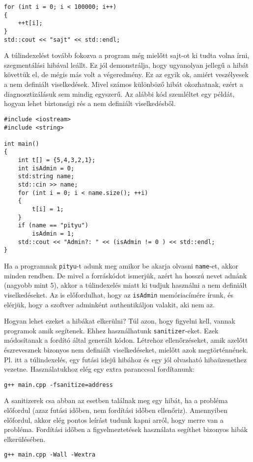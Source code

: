 \documentclass[a4paper,11.5pt,table]{article}
\begin{document}
	\begin{lstlisting}
for (int i = 0; i < 100000; i++)
{
	++t[i];
}
std::cout << "sajt" << std::endl;
	\end{lstlisting} 
	A túlindexelést tovább fokozva a program még mielőtt sajt-ot ki tudta volna írni, szegmentálási hibával leállt. Ez jól demonstrálja, hogy ugyanolyan jellegű  a hibát követtük el, de mégis más volt a végeredmény. Ez az egyik ok, amiért veszélyesek a nem definiált viselkedések. Mivel számos különböző hibát okozhatnak, ezért a diagnosztizálásuk sem mindig egyszerű. Az alábbi kód szemléltet egy példát, hogyan lehet biztonsági rés a nem definiált viselkedésből.
	\begin{lstlisting}
#include <iostream>
#include <string>

int main()
{
	int t[] = {5,4,3,2,1};
	int isAdmin = 0;
	std:string name;
	std::cin >> name;
	for (int i = 0; i < name.size(); ++i)
	{
		t[i] = 1;
	}
	if (name == "pityu")
		isAdmin = 1;
	std::cout << "Admin?: " << (isAdmin != 0 ) << std::endl;
}
	\end{lstlisting}
	Ha a programnak \texttt{pityu}-t adunk meg amikor be akarja olvasni \texttt{name}-et, akkor minden rendben. De mivel a forráskódot ismerjük, azért ha hosszú nevet adnánk (nagyobb mint 5), akkor a túlindexelés miatt ki tudjuk használni a nem definiált viselkedéseket. Az is előfordulhat, hogy az \texttt{isAdmin} memóriacímére írunk, és elérjük, hogy a szoftver adminként authentikáljon valakit, aki nem az.
	\medskip
	
	Hogyan lehet ezeket a hibákat elkerülni? Túl azon, hogy figyelni kell, vannak programok amik segítenek. Ehhez használhatunk \texttt{sanitizer}-eket. Ezek módosítanak a fordító által generált kódon. Létrehoz ellenőrzéseket, amik azelőtt észrevesznek bizonyos nem definiált viselkedéseket, mielőtt azok megtörténnének. Pl. itt a túlindexelés, egy futási idejű hibához és egy jól olvasható hibaüzenethez vezetne. Használatukhoz elég egy extra paranccsal fordítanunk:
	
	{\centering\texttt{g++ main.cpp -fsanitize=address}\par }
	
	A sanitizerek csa abban az esetben találnak meg egy hibát, ha a probléma előfordul (azaz futási időben, nem fordítási időben ellenőriz). Amennyiben előfordul, akkor elég pontos leírást tudunk kapni arról, hogy merre van a probléma. Fordítási időben a figyelmeztetések használata segíthet bizonyos hibák elkerülésében.
	
	{\centering \texttt{g++ main.cpp -Wall -Wextra} \par}
	
\end{document}
